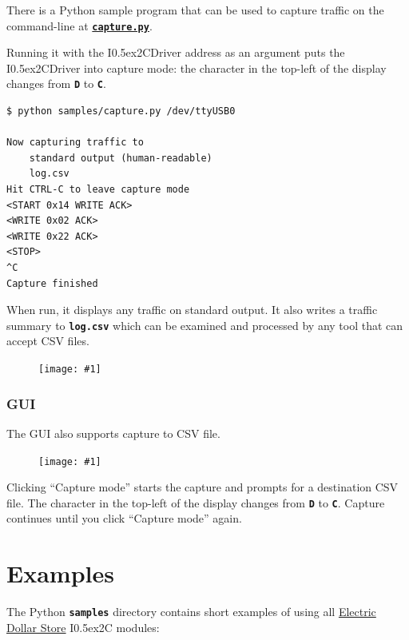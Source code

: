\documentclass{article}
\newcommand{\two}{\raise0.5ex\hbox{\footnotesize{2}}}
\newcommand{\iic}{I\two{}C}
\newcommand{\iicdriver}{I\two{}CDriver}
\newcommand{\png}[1]{
\begin{figure}[H]
\begin{center}
\texttt{[image: \#1]}
\end{center}
\end{figure}
}
\newcommand{\mach}[1]{\texttt{\textbf{#1}}}
\newcommand{\gap}{\vspace{10pt}}
\begin{document}
There is a Python sample program that can be used to capture traffic on the command-line at
\href{https://github.com/jamesbowman/i2cdriver/blob/master/python/samples/capture.py}{\mach{capture.py}}.

Running it with the \iicdriver{} address as an argument puts the \iicdriver{} into capture mode:
the character in the top-left of the display changes from \mach{D} to \mach{C}.

\begin{lstlisting}
$ python samples/capture.py /dev/ttyUSB0

Now capturing traffic to
    standard output (human-readable)
    log.csv
Hit CTRL-C to leave capture mode
<START 0x14 WRITE ACK>
<WRITE 0x02 ACK>
<WRITE 0x22 ACK>
<STOP>
^C
Capture finished
\end{lstlisting}

When run, it displays any traffic on standard output.
It also writes a traffic summary to \mach{log.csv} which
can be examined and processed by any tool that can accept CSV files.

\png{img/i2cdriver/csv}

\subsubsection{GUI}

The GUI also supports capture to CSV file.

\png{img/i2cdriver/win32-gui-capture}

Clicking ``Capture mode'' starts the capture
and prompts for a destination CSV file.
The character in the top-left of the display changes from \mach{D} to \mach{C}.
Capture continues until you click ``Capture mode'' again.

\newpage
\section{Examples}

The Python \mach{samples} directory contains short examples of using all
\href{https://electricdollarstore.com}{Electric Dollar Store} \iic{} modules:\gap
\end{document}
